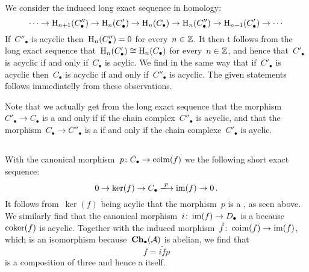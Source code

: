 \section{}





\subsection{}

We consider the induced long exact sequence in homology:
\[
  \dotsb
  \to
  \operatorname{H}_{n+1}( C''_\bullet )
  \to
  \operatorname{H}_n( C'_\bullet )
  \to
  \operatorname{H}_n( C_\bullet )
  \to
  \operatorname{H}_n( C''_\bullet )
  \to
  \operatorname{H}_{n-1}( C'_\bullet )
  \to
  \dotsb
\]
If~$C''_\bullet$ is acyclic then~$\operatorname{H}_n(C''_\bullet) = 0$ for every~$n \in \mathbb{Z}$.
It then t follows from the long exact sequence that~$\operatorname{H}_n(C'_\bullet) \cong \operatorname{H}_n(C_\bullet)$ for every~$n \in \mathbb{Z}$, and hence that~$C'_\bullet$ is acyclic if and only if~$C_\bullet$ is acylic.
We find in the same way that if~$C'_\bullet$ is acyclic then~$C_\bullet$ is acyclic if and only if~$C''_\bullet$ is acyclic.
The given statements follows immediatelly from these observations.

Note that we actually get from the long exact sequence that the morphism~$C'_\bullet \to C_\bullet$ is a {\qim} and only if if the chain complex~$C''_\bullet$ is acyclic, and that the morphism~$C_\bullet \to C''_\bullet$ is a {\qim} if and only if the chain complexe~$C'_\bullet$ is ayclic.





\subsection{}

With the canonical morphism~$p \colon C_\bullet \to \operatorname{coim}(f)$ we the following short exact sequence:
\[
  0
  \to
  \ker(f)
  \to
  C_\bullet
  \xlongto{p}
  \im(f)
  \to
  0 \,.
\]
It follows from~$\ker(f)$ being acylic that the morphism~$p$ is a {\qim}, as seen above.
We similarly find that the canonical morphism~$i \colon \operatorname{im}(f) \to D_\bullet$ is a {\qim} because~$\operatorname{coker}(f)$ is acyclic.
Together with the induced morphism~$\tilde{f} \colon \operatorname{coim}(f) \to \operatorname{im}(f)$, which is an isomorphism because~$\mathbf{Ch}_\bullet(\mathcal{A})$ is abelian, we find that
\[
    f
  = i \tilde{f} p
\]
is a composition of three {\qim} and hence a {\qim} itself.





